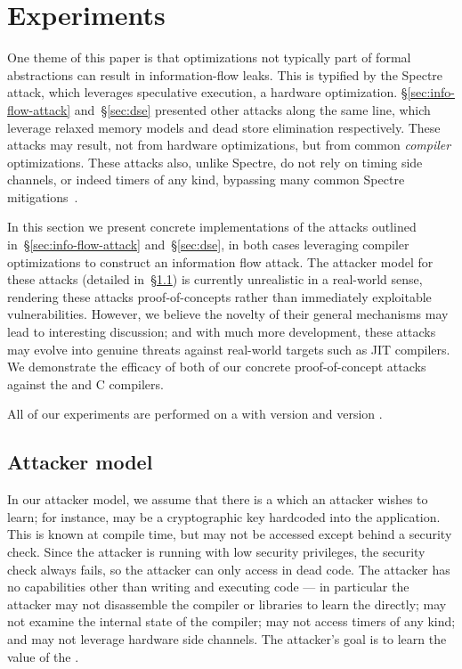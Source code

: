 \section{Experiments}
\label{sec:experiments}

One theme of this paper is that optimizations not typically part of formal
abstractions can result in information-flow leaks.
This is typified by the Spectre attack, which leverages speculative execution,
a hardware optimization.
\S\ref{sec:info-flow-attack} and~\S\ref{sec:dse} presented other attacks
along the same line, which leverage relaxed memory models and dead store
elimination respectively.
These attacks may result,
not from hardware optimizations, but from common \emph{compiler} optimizations.
These attacks also, unlike Spectre, do not rely on timing side channels, or
indeed timers of any kind, bypassing many common Spectre mitigations~\cite{???}.

In this section we present concrete implementations of the attacks outlined
in~\S\ref{sec:info-flow-attack} and~\S\ref{sec:dse}, in both cases
leveraging compiler optimizations to construct an information flow attack.
The attacker model for these attacks (detailed in~\S\ref{subsec:attacker-model})
is currently unrealistic in a
real-world sense, rendering these attacks proof-of-concepts rather than
immediately exploitable vulnerabilities.
However, we believe the novelty of their general mechanisms may lead to
interesting discussion; and with much more development, these attacks may
evolve into genuine threats against real-world targets such as JIT compilers.
We demonstrate the efficacy of both of our concrete proof-of-concept
attacks against
the {\CLANG} and {\GCC} C compilers.

All of our experiments are performed on a  with
{\CLANG} version  and {\GCC} version .

\subsection{Attacker model}
\label{subsec:attacker-model}

In our attacker model, we assume that there is a {\SEC} which an
attacker wishes to learn; for instance, {\SEC} may be a cryptographic
key hardcoded into the application.
This {\SEC} is known at compile time, but may not be
accessed except behind a security check.
Since the attacker is running with low security privileges,
the security check always fails,
so the attacker can only access {\SEC} in dead code.
The attacker has no capabilities other than writing and executing code --- in
particular the attacker may not disassemble the compiler or libraries to learn
the {\SEC} directly; may not examine the internal state of the compiler;
may not access timers of any kind; and may not leverage hardware side channels.
The attacker's goal is to learn the value of the {\SEC}.

